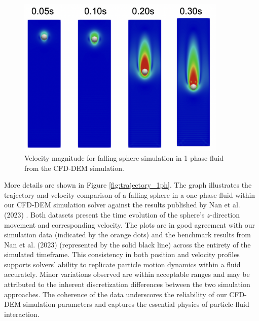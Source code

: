 \begin{figure}[!ht]
    \centering
    \includegraphics[width=10cm]{Images/chap3/1ph_exp_me.png}
    \caption{Velocity magnitude for falling sphere simulation in 1 phase fluid from the CFD-DEM simulation.}
    \label{fig:1ph_exp_me}
\end{figure}

More details are shown in Figure \ref{fig:trajectory_1ph}. The graph illustrates the trajectory and velocity comparison of a falling sphere in a one-phase fluid within our CFD-DEM simulation solver against the results published by Nan et al. (2023) \cite{nan2023high}. Both datasets present the time evolution of the sphere's $z$-direction movement and corresponding velocity. The plots are in good agreement with our simulation data (indicated by the orange dots) and the benchmark results from Nan et al. (2023)\cite{nan2023high} (represented by the solid black line) across the entirety of the simulated timeframe. This consistency in both position and velocity profiles supports solvers' ability to replicate particle motion dynamics within a fluid accurately. Minor variations observed are within acceptable ranges and may be attributed to the inherent discretization differences between the two simulation approaches. The coherence of the data underscores the reliability of our CFD-DEM simulation parameters and captures the essential physics of particle-fluid interaction.

